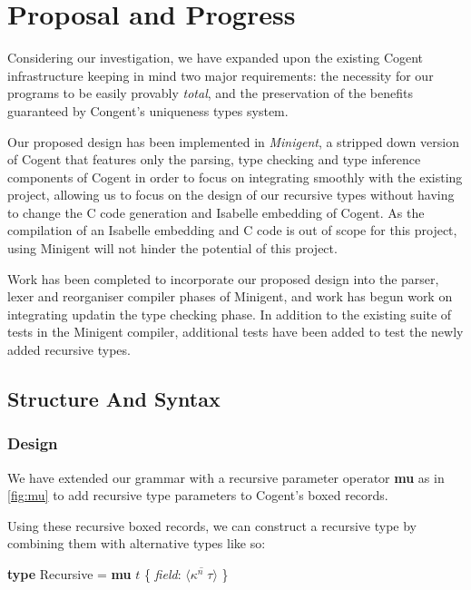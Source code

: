 \chapter{Proposal and Progress}\label{ch:style}

Considering our investigation, we have expanded upon the existing Cogent infrastructure keeping in mind
two major requirements: the necessity for our programs to be easily provably \textit{total},
and the preservation of the benefits guaranteed by Congent's uniqueness types system.

Our proposed design has been implemented in \textit{Minigent}, a stripped down version of Cogent that
features only the parsing, type checking and type inference components of Cogent in order to
focus on integrating smoothly with the existing project, allowing us to focus on the design
of our recursive types without having to change the C code generation and Isabelle embedding of Cogent.
As the compilation of an Isabelle embedding and C code is out of scope for this project,
using Minigent will not hinder the potential of this project.

Work has been completed to incorporate our proposed design into the parser, lexer and reorganiser compiler phases of
Minigent, and work has begun work on integrating updatin the type checking phase.
In addition to the existing suite of tests in the Minigent compiler, additional tests have 
been added to test the newly added recursive types.

\section{Structure And Syntax}

\subsection{Design}

We have extended our grammar with a recursive parameter operator \textbf{mu} as in \autoref{fig:mu} to add 
recursive type parameters to Cogent's boxed records.

Using these recursive boxed records, we can construct a recursive type by combining them with alternative types like so:

\begin{center}
    \textbf{type} Recursive = \textbf{mu} $t$ \{ \textit{field}: $\langle \overline{\kappa^n\; \tau} \rangle$ \}
\end{center}

